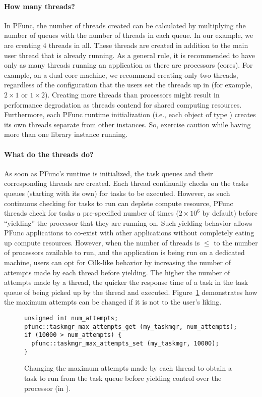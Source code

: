 \paragraph{How many threads?} In PFunc, the number of threads created can be
calculated by multiplying the number of queues with the number of threads in
each queue. In our example, we are creating 4 threads in all. These threads are
created in addition to the main user thread that is already running. As a
general rule, it is recommended to have only as many threads running an
application as there are processors (cores). For example, on a dual core
machine, we recommend creating only two threads, regardless of the
configuration that the users set the threads up in (for example, $2\times{}1$
or $1\times{}2$). Creating more threads than processors might result in
performance degradation as threads contend for shared computing resources. 
Furthermore, each PFunc runtime initialization (i.e., each object of type 
) creates its own threads separate from other instances. So, 
exercise caution while having more than one library instance running.

\paragraph{What do the threads do?} As soon as PFunc's runtime is initialized,
the task queues and their corresponding threads are created. Each thread 
continually checks on the tasks queues (starting with its own) for tasks to 
be executed. However, as such continuous checking for tasks to run can deplete
compute resource, PFunc threads check for tasks a pre-specified number of times
($2\times10^{6}$ by default) before ``yielding'' the processor that they are
running on. Such yielding behavior allows PFunc applications to co-exist with
other applications without completely eating up compute resources. However, 
when the number of threads is $\le{}$ to the number of processors available to
run, and the application is being run on a dedicated machine, users can opt for
Cilk-like behavior by increasing the number of attempts made by each thread
before yielding. The higher the number of attempts made by a thread, the
quicker the response time of a task in the task queue of being picked up by the
thread and executed. Figure~\ref{fig:attempts} demonstrates how the maximum
attempts can be changed if it is not to the user's liking. 

\begin{figure}
\begin{center}
\begin{minipage}{0.60\textwidth}
\begin{lstlisting}[frame=lrtb]
unsigned int num_attempts;
pfunc::taskmgr_max_attempts_get (my_taskmgr, num_attempts);
if (10000 > num_attempts) {
  pfunc::taskmgr_max_attempts_set (my_taskmgr, 10000);
}
\end{lstlisting}
\end{minipage}
\end{center}
\caption {Changing the maximum attempts made by each thread to obtain a task to 
run from the task queue before yielding control over the processor (in \Cpp{}).}
\label{fig:attempts}
\end{figure}


